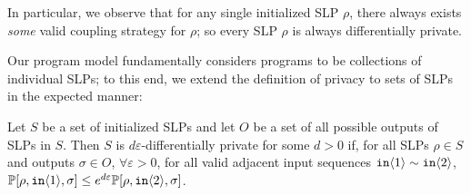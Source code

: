 In particular, we observe that for any single initialized SLP $\rho$, there always exists \textit{some} valid coupling strategy for $\rho$; so every SLP $\rho$ is always differentially private. 

Our program model fundamentally considers programs to be collections of individual SLPs; to this end, we extend the definition of privacy to sets of SLPs in the expected manner:

\begin{defn}\label{setOfPathsDPDefn}
  Let $S$ be a set of initialized SLPs and let $O$ be a set of all possible outputs of SLPs in $S$. 
  Then $S$ is $d\varepsilon$-differentially private for some $d>0$ if, for all SLPs $\rho\in S$ and outputs $\sigma\in O$, $\forall \varepsilon>0$, for all valid adjacent input sequences $\texttt{in}\langle1 \rangle\sim \texttt{in}\langle2 \rangle$, $\mathbb{P}[\rho, \texttt{in}\langle1 \rangle, \sigma]\leq e^{d\varepsilon}\mathbb{P}[\rho, \texttt{in}\langle2 \rangle, \sigma]$.
\end{defn}



